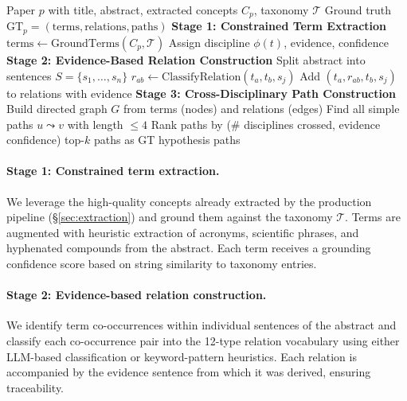 \documentclass{article}
\begin{document}
\begin{algorithm}[t]
\caption{Evidence-Grounded GT Construction}
\label{alg:gt}
\begin{algorithmic}[1]
\REQUIRE Paper $p$ with title, abstract, extracted concepts $C_p$, taxonomy $\mathcal{T}$
\ENSURE Ground truth $\text{GT}_p = (\text{terms}, \text{relations}, \text{paths})$
\STATE \textbf{Stage 1: Constrained Term Extraction}
\STATE $\text{terms} \leftarrow \text{GroundTerms}(C_p, \mathcal{T})$ 
    \STATE Assign discipline $\phi(t)$, evidence, confidence
\ENDFOR
\STATE \textbf{Stage 2: Evidence-Based Relation Construction}
\STATE Split abstract into sentences $S = \{s_1, \ldots, s_n\}$
    \STATE $r_{ab} \leftarrow \text{ClassifyRelation}(t_a, t_b, s_j)$
    \STATE Add $(t_a, r_{ab}, t_b, s_j)$ to relations with evidence
\ENDFOR
\STATE \textbf{Stage 3: Cross-Disciplinary Path Construction}
\STATE Build directed graph $G$ from terms (nodes) and relations (edges)
    \STATE Find all simple paths $u \leadsto v$ with length $\leq 4$
\ENDFOR
\STATE Rank paths by (\# disciplines crossed, evidence confidence)
\RETURN top-$k$ paths as GT hypothesis paths
\end{algorithmic}
\end{algorithm}

\paragraph{Stage 1: Constrained term extraction.}
We leverage the high-quality concepts already extracted by the production pipeline (\S\ref{sec:extraction}) and ground them against the taxonomy $\mathcal{T}$.
Terms are augmented with heuristic extraction of acronyms, scientific phrases, and hyphenated compounds from the abstract.
Each term receives a grounding confidence score based on string similarity to taxonomy entries.

\paragraph{Stage 2: Evidence-based relation construction.}
We identify term co-occurrences within individual sentences of the abstract and classify each co-occurrence pair into the 12-type relation vocabulary using either LLM-based classification or keyword-pattern heuristics.
Each relation is accompanied by the evidence sentence from which it was derived, ensuring traceability.
\end{document}
